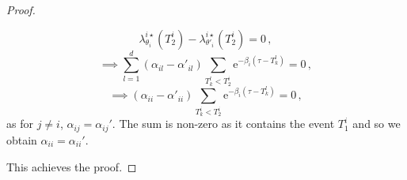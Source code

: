 \begin{subappendices}
\begin{proof}
\begin{itemize}
          \begin{equation*}
          \lambda_{\theta_i}^{i\star}(T_2^i) - \lambda_{\theta'_i}^{i\star}(T^i_2) = 0 \,,
      \end{equation*}
      \begin{equation*}
           \implies \sum_{l=1}^{d}{(\alpha_{il} - \alpha'_{il}) \sum_{T_k^l < T^i_2}{\mathrm{e}^{-\beta_i(\tau - T_k^l)}}}= 0 \,,
      \end{equation*}
      \begin{equation*}
           \implies (\alpha_{ii} - \alpha'_{ii}) \sum_{T_k^i < T^i_2}{\mathrm{e}^{-\beta_i(\tau - T_k^l)}}= 0 \,,
      \end{equation*}
      as for $j\neq i$, $\alpha_{ij}=\alpha_{ij}'$. The sum is non-zero as it contains the event $T^i_1$ and so we obtain $\alpha_{ii}=\alpha_{ii}'$. 
  
  \end{itemize}
  This achieves the proof.
  \end{proof}
  

\end{subappendices}
